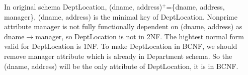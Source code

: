 \documentclass[12pt]{article}%
\begin{document}
\noindent In original schema DeptLocation, (dname, address)$^+$=\{dname, address, manager\}, (dname, address) is the minimal key of DeptLocation. Nonprime attribute manager is not fully functionally dependent on (dname, address) as dname$\rightarrow$manager, so DeptLocation is not in 2NF. The hightest normal form valid for DeptLocation is 1NF. To make DeptLocation in BCNF, we should remove manager attribute which is already in Department schema. So the (dname, address) will be the only attribute of DeptLocation, it is in BCNF. 



\clearpage
\end{document}
